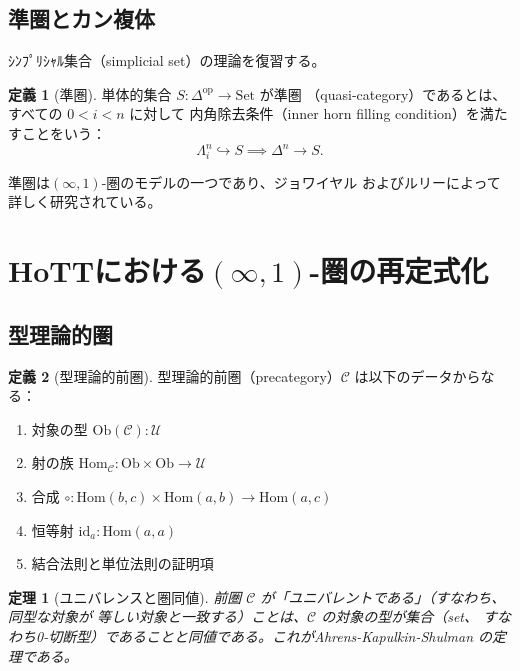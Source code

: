 \documentclass[12pt,a4paper]{article}
\newtheorem{theorem}{定理}[section]
\theoremstyle{definition}
\newtheorem{definition}{定義}[section]
\begin{document}
\subsection{準圏とカン複体}

ｼﾝﾌﾟﾘｼｬﾙ集合（simplicial set）の理論を復習する。

\begin{definition}[準圏]
単体的集合 $S : \Delta^{\mathrm{op}} \to \mathrm{Set}$ が準圏
（quasi-category）であるとは、すべての $0 < i < n$ に対して
内角除去条件（inner horn filling condition）を満たすことをいう：
\begin{equation}
  \Lambda^n_i \hookrightarrow S \implies \Delta^n \to S.
\end{equation}
\end{definition}

準圏は$(\infty,1)$-圏のモデルの一つであり、ジョワイヤル
\cite{joyal2008theory}およびルリー\cite{lurie2009htt}によって
詳しく研究されている。


\section{HoTTにおける$(\infty,1)$-圏の再定式化}

\subsection{型理論的圏}

\begin{definition}[型理論的前圏]
型理論的前圏（precategory）$\mathcal{C}$ は以下のデータからなる：
\begin{enumerate}[label=(\arabic*)]
  \item 対象の型 $\mathrm{Ob}(\mathcal{C}) : \mathcal{U}$
  \item 射の族 $\mathrm{Hom}_\mathcal{C} : \mathrm{Ob} \times \mathrm{Ob} \to \mathcal{U}$
  \item 合成 $\circ : \mathrm{Hom}(b,c) \times \mathrm{Hom}(a,b) \to \mathrm{Hom}(a,c)$
  \item 恒等射 $\mathrm{id}_a : \mathrm{Hom}(a,a)$
  \item 結合法則と単位法則の証明項
\end{enumerate}
\end{definition}

\begin{theorem}[ユニバレンスと圏同値]\label{thm:univalent-cat}
前圏 $\mathcal{C}$ が「ユニバレントである」（すなわち、同型な対象が
等しい対象と一致する）ことは、$\mathcal{C}$ の対象の型が集合（set、
すなわち0-切断型）であることと同値である。これがAhrens-Kapulkin-Shulman
の定理\cite{aks2015univalent}である。
\end{theorem}
\end{document}
